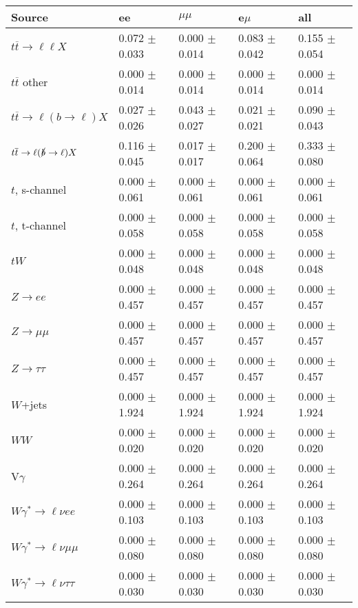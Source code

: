 \begin{tabular}{l | l l l l}
\hline\hline
 Source  &  ee  &  $\mu\mu$  &  e$\mu$  &  all \\
\hline
$t\overline{t}\rightarrow \ell\ell X$ &  0.072 $\pm$  0.033 &  0.000 $\pm$  0.014 &  0.083 $\pm$  0.042 &  0.155 $\pm$  0.054\\
$t\overline{t}$ other &  0.000 $\pm$  0.014 &  0.000 $\pm$  0.014 &  0.000 $\pm$  0.014 &  0.000 $\pm$  0.014\\
$t\overline{t}\rightarrow \ell(b\rightarrow \ell)X$ &  0.027 $\pm$  0.026 &  0.043 $\pm$  0.027 &  0.021 $\pm$  0.021 &  0.090 $\pm$  0.043\\
$t\overline{t}\rightarrow \ell(\slashed{b}\rightarrow \ell)X$ &  0.116 $\pm$  0.045 &  0.017 $\pm$  0.017 &  0.200 $\pm$  0.064 &  0.333 $\pm$  0.080\\
\hline
$t$, s-channel &  0.000 $\pm$  0.061 &  0.000 $\pm$  0.061 &  0.000 $\pm$  0.061 &  0.000 $\pm$  0.061\\
$t$, t-channel &  0.000 $\pm$  0.058 &  0.000 $\pm$  0.058 &  0.000 $\pm$  0.058 &  0.000 $\pm$  0.058\\
$tW$ &  0.000 $\pm$  0.048 &  0.000 $\pm$  0.048 &  0.000 $\pm$  0.048 &  0.000 $\pm$  0.048\\
\hline
$Z\rightarrow ee$ &  0.000 $\pm$  0.457 &  0.000 $\pm$  0.457 &  0.000 $\pm$  0.457 &  0.000 $\pm$  0.457\\
$Z\rightarrow\mu\mu$ &  0.000 $\pm$  0.457 &  0.000 $\pm$  0.457 &  0.000 $\pm$  0.457 &  0.000 $\pm$  0.457\\
$Z\rightarrow\tau\tau$ &  0.000 $\pm$  0.457 &  0.000 $\pm$  0.457 &  0.000 $\pm$  0.457 &  0.000 $\pm$  0.457\\
$W$+jets &  0.000 $\pm$  1.924 &  0.000 $\pm$  1.924 &  0.000 $\pm$  1.924 &  0.000 $\pm$  1.924\\
$WW$ &  0.000 $\pm$  0.020 &  0.000 $\pm$  0.020 &  0.000 $\pm$  0.020 &  0.000 $\pm$  0.020\\
\hline
V$\gamma$ &  0.000 $\pm$  0.264 &  0.000 $\pm$  0.264 &  0.000 $\pm$  0.264 &  0.000 $\pm$  0.264\\
$W\gamma^{*}\rightarrow\ell\nu e e$ &  0.000 $\pm$  0.103 &  0.000 $\pm$  0.103 &  0.000 $\pm$  0.103 &  0.000 $\pm$  0.103\\
$W\gamma^{*}\rightarrow\ell\nu\mu\mu$ &  0.000 $\pm$  0.080 &  0.000 $\pm$  0.080 &  0.000 $\pm$  0.080 &  0.000 $\pm$  0.080\\
$W\gamma^{*}\rightarrow\ell\nu\tau\tau$ &  0.000 $\pm$  0.030 &  0.000 $\pm$  0.030 &  0.000 $\pm$  0.030 &  0.000 $\pm$  0.030\\

\end{tabular}
